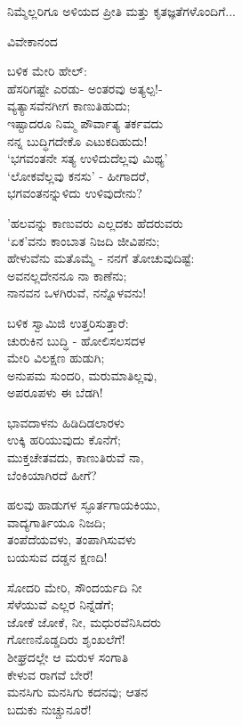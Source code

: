ನಿಮ್ಮೆಲ್ಲರಿಗೂ ಅಳಿಯದ ಪ್ರೀತಿ ಮತ್ತು ಕೃತಜ್ಞತೆಗಳೊಂದಿಗೆ...

\begin{flushright}
ವಿವೇಕಾನಂದ
\end{flushright}

\begin{myquote}
ಬಳಿಕ ಮೇರಿ ಹೇಲ್:\\ಹೆಸರಿಗಷ್ಟೇ ಎರಡು- ಅಂತರವು ಅತ್ಯಲ್ಪ!-\\ವ್ಯತ್ಯಾಸವೆನಗೀಗ ಕಾಣುತಿಹುದು;\\ಇಷ್ಟಾದರೂ ನಿಮ್ಮ ಪೌರ್ವಾತ್ಯ ತರ್ಕವದು\\ನನ್ನ ಬುದ್ಧಿಗದೇಕೊ ಎಟುಕದಿಹುದು!\\‘ಭಗವಂತನೇ ಸತ್ಯ ಉಳಿದುದೆಲ್ಲವು ಮಿಥ್ಯ’\\‘ಲೋಕವೆಲ್ಲವು ಕನಸು’ - ಹೀಗಾದರೆ,\\ಭಗವಂತನನ್ನುಳಿದು ಉಳಿವುದೇನು?
\end{myquote}

\begin{myquote}
'ಹಲವನ್ನು ಕಾಣುವರು ಎಲ್ಲದಕು ಹೆದರುವರು\\‘ಏಕ’ವನು ಕಾಂಬಾತ ನಿಜದಿ ಜೀವಿಪನು;\\ಹೇಳುವೆನು ಮತೊಮ್ಮೆ - ನನಗೆ ತೋಚುವುದಿಷ್ಟೆ:\\ಅವನಲ್ಲದೇನನೂ ನಾ ಕಾಣೆನು;\\ನಾನವನ ಒಳಗಿರುವೆ, ನನ್ನೊಳವನು!
\end{myquote}

\begin{myquote}
ಬಳಿಕ ಸ್ವಾಮಿಜಿ ಉತ್ತರಿಸುತ್ತಾರೆ:\\ಚುರುಕಿನ ಬುದ್ಧಿ - ಹೋಲಿಸಲಸದಳ\\ಮೇರಿ ವಿಲಕ್ಷಣ ಹುಡುಗಿ;\\ಅನುಪಮ ಸುಂದರಿ, ಮರುಮಾತಿಲ್ಲವು,\\ಅಪರೂಪಳು ಈ ಬೆಡಗಿ!
\end{myquote}

\begin{myquote}
ಭಾವದಾಳನು ಹಿಡಿದಿಡಲಾರಳು\\ಉಕ್ಕಿ ಹರಿಯುವುದು ಕೊನೆಗೆ;\\ಮುಕ್ತಚೇತವದು, ಕಾಣುತಿರುವೆ ನಾ,\\ಬೆಂಕಿಯಾಗಿರದೆ ಹೀಗೆ?
\end{myquote}

\begin{myquote}
ಹಲವು ಹಾಡುಗಳ ಸ್ಫೂರ್ತಗಾಯಕಿಯು,\\ವಾದ್ಯಗಾರ್ತಿಯೂ ನಿಜದಿ;\\ತಂಪೆದೆಯವಳು, ತಂಪಾಗಿಸುವಳು\\ಬಯಸುವ ದಡ್ಡನ ಕ್ಷಣದಿ!
\end{myquote}

\begin{myquote}
ಸೋದರಿ ಮೇರಿ, ಸೌಂದರ್ಯದಿ ನೀ\\ಸೆಳೆಯುವೆ ಎಲ್ಲರ ನಿನ್ನೆಡೆಗೆ;\\ಜೋಕೆ ಜೋಕೆ, ನೀ, ಮಧುರವೆನಿಸಿದರು\\ಗೋಣನೊಡ್ಡದಿರು ಶೃಂಖಲೆಗೆ!\\ಶೀಘ್ರದಲ್ಲೇ ಆ ಮರುಳ ಸಂಗಾತಿ\\ಕೇಳುವ ರಾಗವೆ ಬೇರೆ!\\ಮನಸಿಗು ಮನಸಿಗು ಕದನವು; ಆತನ\\ಬದುಕು ನುಚ್ಚುನೂರೆ!
\end{myquote}

